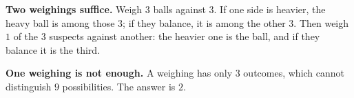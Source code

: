 \textbf{Two weighings suffice.} Weigh $3$ balls against $3$. If one side is heavier, the heavy ball is among those $3$; if they balance, it is among the other $3$. Then weigh $1$ of the $3$ suspects against another: the heavier one is the ball, and if they balance it is the third.

\textbf{One weighing is not enough.} A weighing has only $3$ outcomes, which cannot distinguish $9$ possibilities. The answer is $\boxed{2}$.
